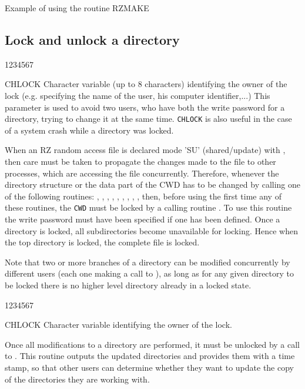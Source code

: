 \begin{XMPt}{Example of using the routine RZMAKE}
\subsection{Lock and unlock a directory}
\Idesc
\begin{DLtt}{1234567}
\item[CHLOCK]Character variable (up to 8 characters) identifying the owner
of the lock (e.g.
specifying the name of the user, his computer identifier,...)
This parameter is used to avoid two users, who have both the
write password for a directory, trying to change it at the same time.
{\tt CHLOCK} is also useful in the case of a system crash while a directory
was locked.
\end{DLtt}
\par 
When an RZ random access file is declared mode 'SU' (shared/update)
with  , then care must be taken to propagate the changes made
to the file to other processes, which are accessing the file
concurrently. Therefore, whenever the
directory structure or the data part of the CWD has to be changed by
calling one of the following routines:
, , , ,
, , , , ,
then, before using the first time any of these routines,
the {\tt CWD} must be locked by a calling routine .
To use this routine the write
password must have been specified if one has been defined.
Once a directory is locked, all
subdirectories become unavailable for locking. Hence when the top
directory is locked, the complete file is locked.
\par 
Note that two or more branches of a directory can be modified
concurrently
by different users (each one making a call to ), as long as
for any given directory to be locked there is no higher level
directory already in a locked state.
\Idesc
\begin{DLtt}{1234567}
\item[CHLOCK]Character variable identifying the owner of the lock.
\end{DLtt}
\par 
Once all modifications to a directory are performed, it must
be unlocked by a call to . This routine outputs the updated
directories and provides them with a time stamp, so that other users
can determine whether they want to update the copy of the directories
they are working with.

\end{XMPt}
